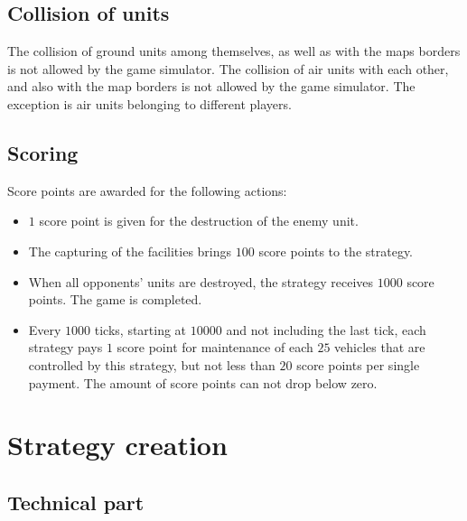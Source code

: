 \section{Collision of units}

The collision of ground units among themselves, as well as with the maps borders is not allowed by the game simulator. The collision of air units with each other, and
also with the map borders is not allowed by the game simulator. The exception is air units belonging to different players.

\section{Scoring}

Score points are awarded for the following actions:
\begin{itemize}
    \item $1$ score point is given for the destruction of the enemy unit.
    \item The capturing of the facilities brings $100$ score points to the strategy.
    \item When all opponents’ units are destroyed, the strategy receives $1000$ score points. The game is completed.
    \item Every $1000$ ticks, starting at $10000$ and not including the last tick, each strategy pays $1$ score point for maintenance of
          each $25$ vehicles that are controlled by this strategy, but not less than $20$ score points per single payment. The amount of
          score points can not drop below zero.
\end{itemize}

\chapter{Strategy creation}

\section{Technical part}

